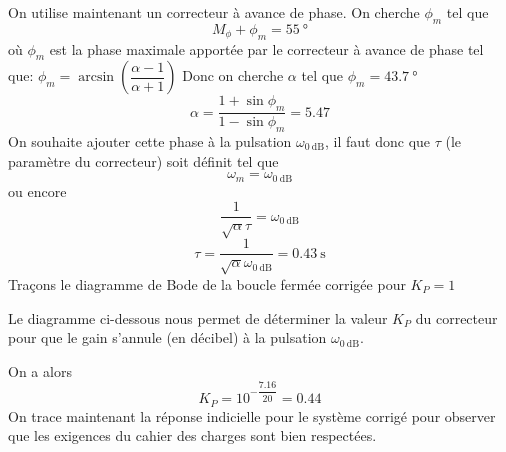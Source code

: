 On utilise maintenant un correcteur à avance de phase.
On cherche $\phi_m$ tel que
\[
    M_\phi+\phi_m=\SI{55}{\degree}
\]
où $\phi_m$ est la phase maximale apportée par le correcteur à avance de phase
tel que:
$\phi_m=\arcsin{\left(\dfrac{\alpha-1}{\alpha+1}\right)}$
Donc on cherche $\alpha$ tel que $\phi_m=\SI{43.7}{\degree}$
\[
    \alpha=\dfrac{1+\sin\phi_m}{1-\sin\phi_m}=5.47
\]
On souhaite ajouter cette phase à la pulsation $\omega_{\SI{0}{\dB}}$, il faut 
donc que $\tau$ (le paramètre du correcteur) soit définit tel que
\[
    \omega_m=\omega_{\SI{0}{\dB}}
\]
ou encore
\[
    \dfrac{1}{\sqrt{\alpha}\tau}=\omega_{\SI{0}{\dB}}
\]
\[
    \tau=\dfrac{1}{\sqrt{\alpha}\omega_{\SI{0}{\dB}}}=\SI{0.43}{\second}
\]
Traçons le diagramme de Bode de la boucle fermée corrigée pour $K_P=1$
\begin{center}
    
\end{center}
Le diagramme ci-dessous nous permet de déterminer la valeur $K_P$ du correcteur
pour que le gain s'annule (en décibel) à la pulsation $\omega_{\SI{0}{\dB}}$.

On a alors 
\[
    K_P=10^{-\dfrac{7.16}{20}}=0.44
\]
On trace maintenant la réponse indicielle pour le système corrigé pour observer
que les exigences du cahier des charges sont bien respectées.
\begin{center}
    
\end{center}

